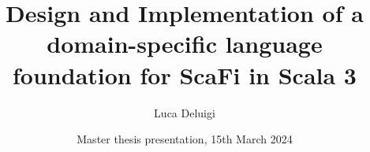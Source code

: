 \title[ScaFi-XC]{Design and Implementation of a domain-specific language foundation for ScaFi in Scala 3}
\author[Luca Deluigi]{Luca Deluigi}
\date[15/03/2024]{Master thesis presentation, 15th March 2024}
